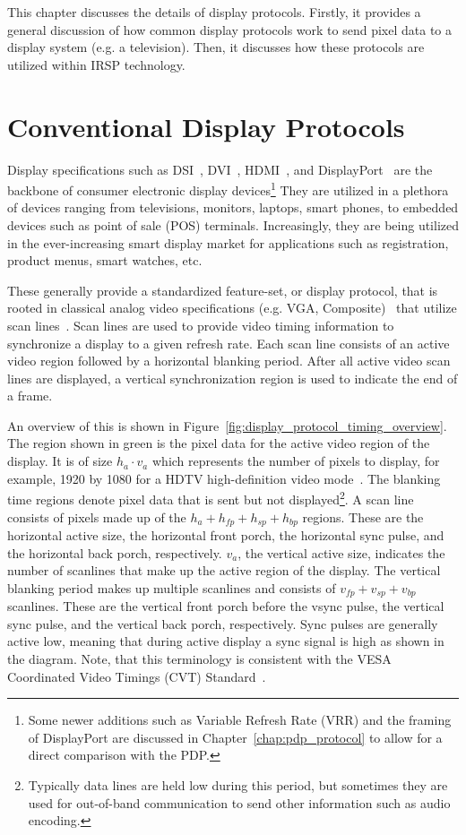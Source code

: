 \label{chap:display_protocols}
This chapter discusses the details of display protocols. Firstly, it provides a general discussion of how common display protocols work to send pixel data to a display system (e.g. a television). Then, it discusses how these protocols are utilized within IRSP technology.

\section{Conventional Display Protocols}
    \label{sec:conventional_display_protocols}

    Display specifications such as DSI~\cite{HDMIForum2017}, DVI~\cite{DDWG1999}, HDMI~\cite{HDMIForum2018}, and DisplayPort~\cite{VESA2016} are the backbone of consumer electronic display devices\footnote{Some newer additions such as Variable Refresh Rate (VRR) and the framing of DisplayPort are discussed in Chapter~\ref{chap:pdp_protocol} to allow for a direct comparison with the PDP.} They are utilized in a plethora of devices ranging from televisions, monitors, laptops, smart phones, to embedded devices such as point of sale (POS) terminals. Increasingly, they are being utilized in the ever-increasing smart display market for applications such as registration, product menus, smart watches, etc.

    These generally provide a standardized feature-set, or display protocol, that is rooted in classical analog video specifications (e.g. VGA, Composite)~\cite{NI2018} that utilize scan lines~\cite{Neal1998}. Scan lines are used to provide video timing information to synchronize a display to a given refresh rate. Each scan line consists of an active video region followed by a horizontal blanking period. After all active video scan lines are displayed, a vertical synchronization region is used to indicate the end of a frame.

    An overview of this is shown in Figure~\ref{fig:display_protocol_timing_overview}. The region shown in green is the pixel data for the active video region of the display. It is of size $h_a\cdot v_a$ which represents the number of pixels to display, for example, 1920 by 1080 for a HDTV high-definition video mode~\cite{MythTV2015}. The blanking time regions denote pixel data that is sent but not displayed\footnote{Typically data lines are held low during this period, but sometimes they are used for out-of-band communication to send other information such as audio encoding.}. A scan line consists of pixels made up of the $h_a+h_{fp}+h_{sp}+h_{bp}$ regions. These are the horizontal active size, the horizontal front porch, the horizontal sync pulse, and the horizontal back porch, respectively. $v_a$, the vertical active size, indicates the number of scanlines that make up the active region of the display. The vertical blanking period makes up multiple scanlines and consists of $v_{fp}+v_{sp}+v_{bp}$ scanlines. These are the vertical front porch before the vsync pulse, the vertical sync pulse, and the vertical back porch, respectively. Sync pulses are generally active low, meaning that during active display a sync signal is high as shown in the diagram. Note, that this terminology is consistent with the VESA Coordinated Video Timings (CVT) Standard~\cite{VESA2013}.

